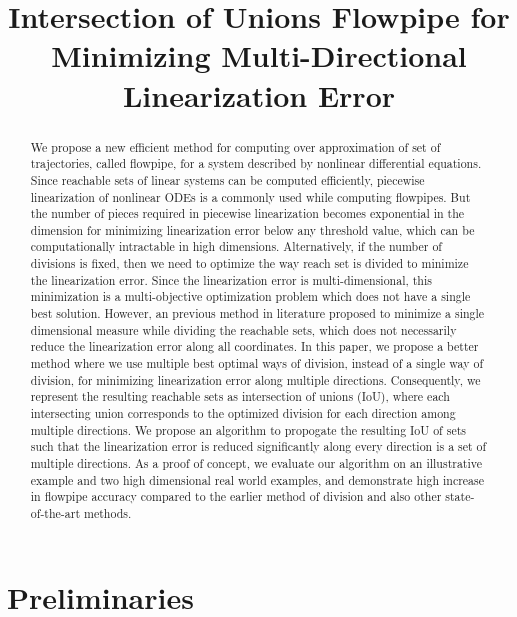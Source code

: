 


\title{Intersection of Unions Flowpipe for Minimizing Multi-Directional Linearization Error}
\author{}
\institute{}
%
    
\maketitle
%
\begin{abstract}
We propose a new efficient method for computing over approximation of
set of trajectories, called flowpipe, for a system described by
nonlinear differential equations.  Since reachable sets of linear
systems can be computed efficiently, piecewise linearization of
nonlinear ODEs is a commonly used while computing flowpipes.  But the
number of pieces required in piecewise linearization becomes
exponential in the dimension for minimizing linearization error below
any threshold value, which can be computationally intractable in high
dimensions.  Alternatively, if the number of divisions is fixed, then
we need to optimize the way reach set is divided to minimize the
linearization error.  Since the linearization error is
multi-dimensional, this minimization is a multi-objective optimization
problem which does not have a single best solution.  However, an
previous method in literature proposed to minimize a single
dimensional measure while dividing the reachable sets, which does not
necessarily reduce the linearization error along all coordinates.  In
this paper, we propose a better method where we use multiple best
optimal ways of division, instead of a single way of division, for
minimizing linearization error along multiple directions.
Consequently, we represent the resulting reachable sets as
intersection of unions (IoU), where each intersecting union
corresponds to the optimized division for each direction among
multiple directions.  We propose an algorithm to propogate the
resulting IoU of sets such that the linearization error is reduced
significantly along every direction is a set of multiple directions.
As a proof of concept, we evaluate our algorithm on an illustrative
example and two high dimensional real world examples, and demonstrate
high increase in flowpipe accuracy compared to the earlier method of division
and also other state-of-the-art methods.
\end{abstract}

\section{Preliminaries}

